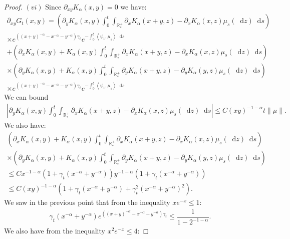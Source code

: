 \documentclass[11pt,a4paper]{article}
\newcommand{\RRP}{\mathbb{R}^+_*}
\newcommand{\brac}[1]{\left\langle#1\right\rangle}
\newcommand{\dd}{\mathop{}\!\mathrm{d}}
\begin{document}
\begin{proof}
    $(vi)$ Since $\partial_{xy}K_\alpha(x,y)= 0$ we have:
    \begin{multline*}
        \partial_{xy}G_t(x,y) = \left(\partial_y K_\alpha(x,y) \int_0^t \int_{\RRP} \partial_x K_\alpha(x+y,z) - \partial _x K_\alpha(x,z)\mu_s(\dd z)\dd s \right) \\
        \times e^{\left((x+y)^{-\alpha} - x^{-\alpha}- y^{-\alpha}\right)\gamma_t} e^{-\int_0^t \brac{\psi_1,\mu_s}\dd s} \\ 
        +\left(\partial_x K_\alpha(x,y) + K_\alpha(x,y) \int_0^t \int_{\RRP} \partial_x K_\alpha(x+y,z) - \partial _x K_\alpha(x,z)\mu_s(\dd z)\dd s\right) \\
        \times \left(\partial_y K_\alpha(x,y) + K_\alpha(x,y) \int_0^t \int_{\RRP} \partial_y K_\alpha(x+y,z) - \partial _y K_\alpha(y,z)\mu_s(\dd z)\dd s\right)\\
        \times e^{\left((x+y)^{-\alpha} - x^{-\alpha}- y^{-\alpha}\right)\gamma_t} e^{-\int_0^t \brac{\psi_1,\mu_s}\dd s}
    \end{multline*}
    We can bound
    \begin{align*}
        \left|\partial_y K_\alpha(x,y) \int_0^t \int_{\RRP} \partial_x K_\alpha(x+y,z) - \partial _x K_\alpha(x,z)\mu_s(\dd z)\dd s \right| \leq C(xy)^{-1-\alpha} t\|\mu\|.
    \end{align*}
    We also have:
    \begin{multline*}
        \left(\partial_x K_\alpha(x,y) + K_\alpha(x,y) \int_0^t \int_{\RRP} \partial_x K_\alpha(x+y,z) - \partial _x K_\alpha(x,z)\mu_s(\dd z)\dd s\right) \\
        \times \left(\partial_y K_\alpha(x,y) + K_\alpha(x,y) \int_0^t \int_{\RRP} \partial_y K_\alpha(x+y,z) - \partial _y K_\alpha(y,z)\mu_s(\dd z)\dd s\right) \\
        \leq C x^{-1-\alpha}\left(1 +  \gamma_t (x^{-\alpha} + y^{-\alpha})\right)y^{-1-\alpha} \left(1 +  \gamma_t(x^{-\alpha} + y^{-\alpha})\right)\\
        \leq C (xy)^{-1-\alpha}\left( 1 + \gamma_t (x^{-\alpha} + y^{-\alpha}) + \gamma_t^2  (x^{-\alpha} + y^{-\alpha})^2\right).
    \end{multline*}
    We saw in the previous point that from the inequality $xe^{-x} \leq 1$:
    \begin{align*}
        \gamma_t (x^{-\alpha} + y^{-\alpha}) e^{\left((x+y)^{-\alpha} - x^{-\alpha}- y^{-\alpha}\right)\gamma_t} \leq \dfrac{1}{1-2^{-1-\alpha}}.
    \end{align*}
    We also have from the inequality $x^2 e^{-x} \leq 4$:

\end{proof}
\end{document}
